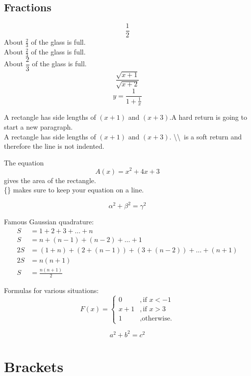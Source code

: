\documentclass[12pt]{article}
\begin{document}
\subsection{Fractions}
$$\frac{1}{2}$$
About $\displaystyle \frac{2}{3}$ of the glass is full.\\[12pt]
About $\frac{2}{3}$ of the glass is full.\\[6pt]
About $\dfrac{2}{3}$ of the glass is full.
$$\frac{\sqrt{x+1}}{\sqrt{x+2}}$$
$$y=\frac{1}{  1+\frac{1}{x}  }$$

A rectangle has side lengths of $(x+1)$ and $(x+3)$.A hard return is going to start a new paragraph.\\
A rectangle has side lengths of $(x+1)$ and $(x+3)$. \textbackslash\textbackslash\ is a soft return and therefore the line is not indented.

The equation $${A(x)=x^2+4x+3}$$ gives the area of the rectangle.\\
\{\} makes sure to keep your equation on a line.\cite{trevisanato2000tea}

\begin{equation}\label{eq0}
    \alpha^2+\beta^2=\gamma^2
\end{equation}

Famous Gaussian quadrature:
\begin{equation*}
    \begin{split}
        S&=1+2+3+\dots+n\\
        S&=n+(n-1)+(n-2)+\dots+1\\
        2S&=(1+n)+(2+(n-1))+(3+(n-2))+\dots+(n+1)\\
        2S&=n(n+1)\\
        S&=\frac{n(n+1)}{2} 
    \end{split}
\end{equation*}

Formulas for various situations:
\begin{equation}
    F(x)=
    \begin{cases}
        0&,\text{if $x<-1$}\\
        x+1&,\text{if $x>3$}\\
        1&,\text{otherwise.}
    \end{cases}
\end{equation}

\[
    a^2+b^2=c^2
\]

\section{Brackets}
\end{document}

